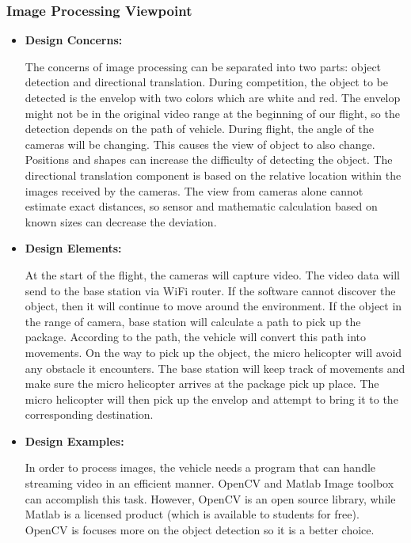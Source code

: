 \documentclass[onecolumn, draftclsnofoot,10pt, compsoc]{IEEEtran}
\begin{document}
\subsubsection{Image Processing Viewpoint}
\begin{itemize}
\item{ \textbf{Design Concerns:}}

The concerns of image processing can be separated into two parts: object detection and directional translation. During competition, the object to be detected is the envelop with two colors which are white and red. The envelop might not be in the original video range at the beginning of our flight, so the detection depends on the path of vehicle. During flight, the angle of the cameras will be changing. This causes the view of object to also change. Positions and shapes can increase the difficulty of detecting the object. The directional translation component is based on the relative location within the images received by the cameras. The view from cameras alone cannot estimate exact distances, so sensor and mathematic calculation based on known sizes can decrease the deviation. \\

\item{ \textbf{Design Elements:}}

At the start of the flight, the cameras will capture video. The video data will send to the base station via WiFi router. If the software cannot discover the object, then it will continue to move around the environment. If the object in the range of camera, base station will calculate a path to pick up the package. According to the path, the vehicle will convert this path into movements. On the way to pick up the object, the micro helicopter will avoid any obstacle it encounters. The base station will keep track of movements and make sure the micro helicopter arrives at the package pick up place. The micro helicopter will then pick up the envelop and attempt to bring it to the corresponding destination. \\ 
\item{ \textbf{Design Examples:}} %

In order to process images, the vehicle needs a program that can handle streaming video in an efficient manner. OpenCV and Matlab Image toolbox can accomplish this task. However, OpenCV is an open source library, while Matlab is a licensed product (which is available to students for free). OpenCV is focuses more on the object detection so it is a better choice.\\
\end{itemize}
\end{document}
